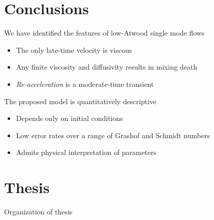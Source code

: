 \documentclass[12pt]{beamer}
\begin{document}
\section{Conclusions}
\begin{frame}
We have identified the features of low-Atwood single mode flows
\begin{itemize}
  \item The only late-time velocity is viscous
  \item Any finite viscosity and diffusivity results in mixing death
  \item \textit{Re-acceleration} is a moderate-time transient
\end{itemize}
\vspace{10pt} \pause

The proposed model is quantitatively descriptive
\begin{itemize}
  \item Depends only on initial conditions
  \item Low error rates over a range of Grashof and Schmidt numbers
  \item Admits physical interpretation of parameters
\end{itemize}
\end{frame}

\appendix
\section*{Thesis}
\begin{frame}{Organization of thesis}

\resizebox{\textwidth}{!}{}
\end{frame}

\end{document}
